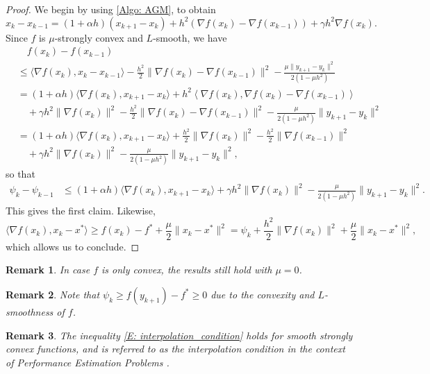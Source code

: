 \documentclass[pdflatex,sn-mathphys-num]{sn-jnl}
\theoremstyle{thmstyleone}
\theoremstyle{thmstyletwo}
\newtheorem{remark}{Remark}
\theoremstyle{thmstylethree}
\begin{document}
\begin{proof}
We begin by using \eqref{Algo: AGM}, to obtain 
$$ x_k - x_{k-1} = (1+\alpha h)(x_{k+1}-x_k) + h^2\left( \nabla f(x_k) - \nabla f(x_{k-1}) \right) + \gamma h^2 \nabla f(x_k). $$
Since $f$ is $\mu$-strongly convex and $L$-smooth, we have
\begin{align}
\nonumber
&\quad f(x_k) - f(x_{k-1}) \\
\label{E: interpolation_condition}
&\le \langle \nabla f(x_k), x_k - x_{k-1} \rangle - \frac{h^2}{2}\| \nabla f(x_k) - \nabla f(x_{k-1}) \|^2 - \frac{\mu\| y_{k+1} - y_k \|^2}{2(1-\mu h^2)}\\
\nonumber
&= (1+\alpha h)\langle \nabla f(x_k), x_{k+1}-x_k \rangle
  + h^2\left\langle \nabla f(x_k), \nabla f(x_k) - \nabla f(x_{k-1}) \right\rangle\\
\nonumber
&\quad + \gamma h^2 \| \nabla f(x_k) \|^2 
  - \frac{h^2}{2}\| \nabla f(x_k) - \nabla f(x_{k-1}) \|^2
  - \frac{\mu}{2(1-\mu h^2)}\| y_{k+1} - y_k \|^2 \\
\nonumber
&= (1+\alpha h)\langle \nabla f(x_k), x_{k+1}-x_k \rangle 
  + \frac{h^2}{2}\| \nabla f(x_k) \|^2
  - \frac{h^2}{2}\| \nabla f(x_{k-1}) \|^2 \\
\nonumber
&\quad + \gamma h^2 \| \nabla f(x_k) \|^2  
  - \frac{\mu}{2(1-\mu h^2)}\| y_{k+1} - y_k \|^2,  
\end{align}
so that
\begin{align*}
\psi_k - \psi_{k-1} 
&\le (1+\alpha h)\langle \nabla f(x_k), x_{k+1}-x_k \rangle + \gamma h^2 \| \nabla f(x_k) \|^2 
 - \frac{\mu}{2(1-\mu h^2)}\| y_{k+1} - y_k \|^2.
\end{align*}
This gives the first claim. Likewise,
$$ \langle \nabla f(x_k), x_k - x^* \rangle 
\ge f(x_k) - f^* + \frac{\mu}{2}\| x_k-x^* \|^2 
= \psi_k + \frac{h^2}{2} \| \nabla f(x_k) \|^2 + \frac{\mu}{2}\| x_k-x^* \|^2, $$
which allows us to conclude.
\end{proof}

\begin{remark}
In case $f$ is only convex, the results still hold with $\mu=0$.
\end{remark}

\begin{remark}
Note that $\psi_k \ge f(y_{k+1})-f^*\ge 0$ due to the convexity and $L$-smoothness of $f$.
\end{remark}

\begin{remark}
The inequality \eqref{E: interpolation_condition} holds for smooth strongly convex functions, and is referred to as the interpolation condition in the context of Performance Estimation Problems \cite[Theorem 4]{Talor_2017_SC}.
\end{remark}
\end{document}
